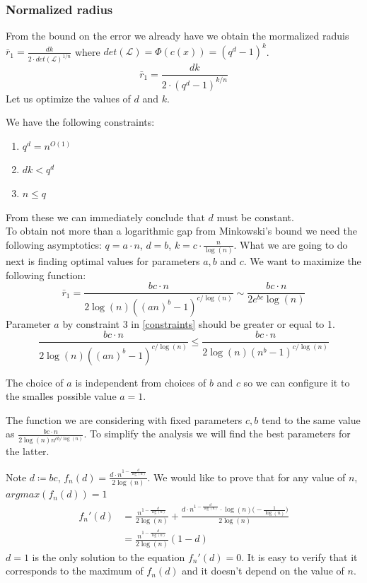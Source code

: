 \documentclass[12pt]{article}
\begin{document}
\subsubsection{Normalized radius}
\label{subsubsec:normalized_discrete_error}
From the bound on the error we already have we obtain the mormalized raduis $\bar{r}_1 = \frac{dk}{2 \cdot det(\mathcal{L})^{1/n}}$ where $det(\mathcal{L}) = \Phi(c(x)) = (q^{d} - 1)^{k}$.
\[
\bar{r}_1 = \frac{dk}{2 \cdot (q^{d} - 1)^{k/n}}
\]
Let us optimize the values of $d$ and $k$.

We have the following constraints:
\begin{enumerate}\label{constraints}
    \item $q^d = n^{O(1)}$
    \item $dk < q^{d}$
    \item $n \leq q$
\end{enumerate}
From these we can immediately conclude that $d$ must be constant. \\

To obtain not more than a logarithmic gap from Minkowski's bound we need the following asymptotics: $q = a \cdot n$, $d = b$, $k =  c \cdot \frac{n}{\log(n)}$. What we are going to do next is finding optimal values for parameters $a, b$ and $c$. We want to maximize the following function:
\[
\bar{r}_1 = \frac{bc \cdot n}{2\log(n)((an)^{b} - 1)^{c/\log(n)}}  \sim \frac{bc \cdot n}{2e^{bc}\log(n)}
\]
 Parameter $a$ by constraint 3 in \ref{constraints} should be greater or equal to 1.
 \[
    \frac{bc \cdot n}{2\log(n)((an)^{b} - 1)^{c/\log(n)}} \leq \frac{bc \cdot n}{2\log(n)(n^{b} - 1)^{c/\log(n)}}
 \]

The choice of $a$ is independent from choices of $b$ and $c$ so we can configure it to the smalles possible value $a = 1$.

The function we are considering with fixed parameters $c, b$ tend to the same value as $\frac{bc \cdot n}{2\log(n)n^{cb/\log(n)}}$. To simplify the analysis we will find the best parameters for the latter.

Note $d \coloneqq bc$, $f_n(d) = \frac{d \cdot n^{1 - \frac{d}
{\log(n)} }}{2\log(n)}$.
We would like to prove that for any value of $n$, $argmax(f_n(d)) = 1$
\[
\begin{split}
    f_n'(d) & = \frac{n^{1 - \frac{d}
    {\log(n)}}}{2\log(n)} + \frac{d \cdot n^{1 - \frac{d}
    {\log(n)}} \cdot \log(n) \big(-\frac{1}{\log(n)}\big)}{2\log(n)} \\
    & = \frac{n^{1 - \frac{d}{\log(n)}}}{2\log(n)}(1-d)
\end{split}
\]
$d = 1$ is the only solution to the equation $f_n'(d) = 0$. It is easy to verify that it corresponds to the maximum of $f_n(d)$ and it doesn't depend on the value of $n$.
\end{document}
